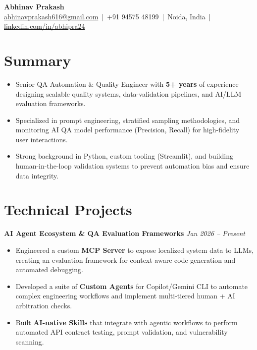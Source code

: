 \documentclass[a4paper,10pt]{article}
\begin{document}
\begin{center}
    {\Huge \textbf{Abhinav Prakash}}\\[4pt]
    \href{mailto:abhinavprakash616@gmail.com}{abhinavprakash616@gmail.com} \,|\, 
    +91 94575 48199 \,|\, 
    Noida, India \,|\, 
    \href{https://linkedin.com/in/abhipra24}{linkedin.com/in/abhipra24}
\end{center}

\section{Summary}
\begin{itemize}
    \item Senior QA Automation \& Quality Engineer with \textbf{5+ years} of experience designing scalable quality systems, data-validation pipelines, and AI/LLM evaluation frameworks.
    \item Specialized in prompt engineering, stratified sampling methodologies, and monitoring AI QA model performance (Precision, Recall) for high-fidelity user interactions.
    \item Strong background in Python, custom tooling (Streamlit), and building human-in-the-loop validation systems to prevent automation bias and ensure data integrity.
\end{itemize}

\section{Technical Projects}

\textbf{AI Agent Ecosystem \& QA Evaluation Frameworks} \hfill \textit{Jan 2026 – Present}
\begin{itemize}
    \item Engineered a custom \textbf{MCP Server} to expose localized system data to LLMs, creating an evaluation framework for context-aware code generation and automated debugging.
    \item Developed a suite of \textbf{Custom Agents} for Copilot/Gemini CLI to automate complex engineering workflows and implement multi-tiered human + AI arbitration checks.
    \item Built \textbf{AI-native Skills} that integrate with agentic workflows to perform automated API contract testing, prompt validation, and vulnerability scanning.
\end{itemize}
\end{document}
